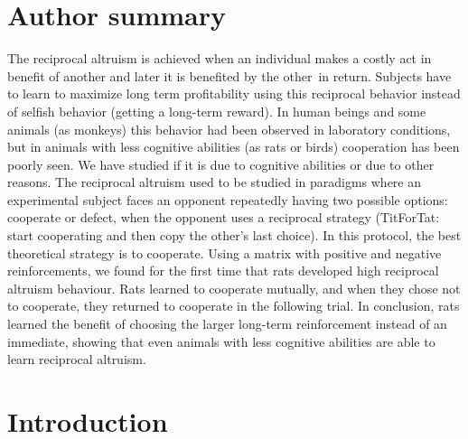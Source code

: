 \documentclass[10pt,letterpaper]{article}
\begin{document}
\section*{Author summary}
The reciprocal altruism is achieved when an individual makes a costly act in benefit of another and later it is benefited by the other in return. Subjects have to learn to maximize long term profitability using this reciprocal behavior instead of selfish behavior (getting a long-term reward). In human beings and some animals (as monkeys) this behavior had been observed in laboratory conditions, but in animals with less cognitive abilities (as rats or birds) cooperation has been poorly seen. We have studied if it is due to cognitive abilities or due to other reasons. The reciprocal altruism used to be studied in paradigms where an experimental subject faces an opponent repeatedly having two possible options: cooperate or defect, when the opponent uses a reciprocal strategy (TitForTat: start cooperating and then copy the other’s last choice). In this protocol, the best theoretical strategy is to cooperate. Using a matrix with positive and negative reinforcements, we found for the first time that rats developed high reciprocal altruism behaviour. Rats learned to cooperate mutually, and when they chose not to cooperate, they returned to cooperate in the following trial. In conclusion, rats learned the benefit of choosing the larger long-term reinforcement instead of an immediate, showing that even animals with less cognitive abilities are able to learn reciprocal altruism.



\linenumbers

\section*{Introduction}
 
\end{document}
